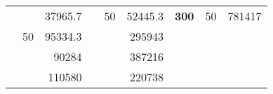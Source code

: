 \begin{table}[H]
\begin{tabular}{|ccrccrccc}
\rowcolor[HTML]{DDFDFF} 
\multicolumn{1}{|c|}{\cellcolor[HTML]{FFFFC7}}                                & \multicolumn{1}{c|}{\cellcolor[HTML]{DDFDFF}}                      & \multicolumn{1}{r|}{\cellcolor[HTML]{DAE8FC}37965.7}   & \multicolumn{1}{c|}{\cellcolor[HTML]{FFFFC7}}                                & \multicolumn{1}{c|}{\multirow{-10}{*}{\cellcolor[HTML]{DDFDFF}50}}  & \multicolumn{1}{r|}{\cellcolor[HTML]{DDFDFF}52445.3}   & \multicolumn{1}{c|}{\multirow{-19}{*}{\cellcolor[HTML]{FFFFC7}\textbf{300}}} & \multicolumn{1}{c|}{\multirow{-10}{*}{\cellcolor[HTML]{DDFDFF}50}} & \multicolumn{1}{r|}{\cellcolor[HTML]{DDFDFF}781417}    \\ \cline{3-3} \cline{5-9} 
\multicolumn{1}{|c|}{\cellcolor[HTML]{FFFFC7}}                                & \multicolumn{1}{c|}{\multirow{-10}{*}{\cellcolor[HTML]{DDFDFF}50}} & \multicolumn{1}{r|}{\cellcolor[HTML]{DDFDFF}95334.3}   & \multicolumn{1}{c|}{\cellcolor[HTML]{FFFFC7}}                                & \multicolumn{1}{c|}{\cellcolor[HTML]{DAE8FC}}                       & \multicolumn{1}{r|}{\cellcolor[HTML]{DAE8FC}295943}    &                                                                              &                                                                    &                                                        \\ \cline{2-3} \cline{6-6}
\multicolumn{1}{|c|}{\cellcolor[HTML]{FFFFC7}}                                & \multicolumn{1}{c|}{\cellcolor[HTML]{DAE8FC}}                      & \multicolumn{1}{r|}{\cellcolor[HTML]{DAE8FC}90284}     & \multicolumn{1}{c|}{\cellcolor[HTML]{FFFFC7}}                                & \multicolumn{1}{c|}{\cellcolor[HTML]{DAE8FC}}                       & \multicolumn{1}{r|}{\cellcolor[HTML]{DDFDFF}387216}    &                                                                              &                                                                    &                                                        \\ \cline{3-3} \cline{6-6}
\multicolumn{1}{|c|}{\cellcolor[HTML]{FFFFC7}}                                & \multicolumn{1}{c|}{\cellcolor[HTML]{DAE8FC}}                      & \multicolumn{1}{r|}{\cellcolor[HTML]{DDFDFF}110580}    & \multicolumn{1}{c|}{\cellcolor[HTML]{FFFFC7}}                                & \multicolumn{1}{c|}{\cellcolor[HTML]{DAE8FC}}                       & \multicolumn{1}{r|}{\cellcolor[HTML]{DAE8FC}220738}    &                                                                              &                                                                    &                                                        \\ \cline{3-3} \cline{6-6}

\end{tabular}
\end{table}
